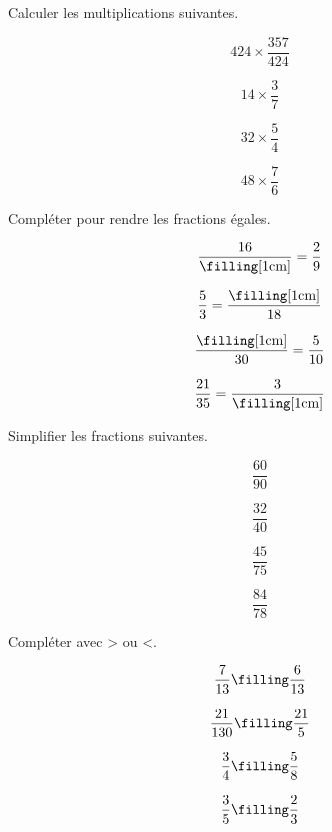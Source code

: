  Calculer les multiplications suivantes.

\begin{multicols}{4}
    $$424\times \dfrac{357}{424}$$\vspace*{1.7cm}
    
    \columnbreak
    $$14\times \dfrac{3}{7}$$\vspace*{1.7cm}
    
    \columnbreak
    $$32\times \dfrac{5}{4}$$\vspace*{1.7cm}
    
    \columnbreak
    $$48\times \dfrac{7}{6}$$\vspace*{1.7cm}
\end{multicols}

 Compléter pour rendre les fractions égales.

\begin{multicols}{4}
    $$ \dfrac{16}{\text{\filling[1cm]}}=\dfrac{2}{9}$$

    $$ \dfrac{5}{3}=\dfrac{\text{\filling[1cm]}}{18}$$

    $$ \dfrac{\text{\filling[1cm]}}{30}=\dfrac{5}{10}$$

    $$ \dfrac{21}{35}=\dfrac{3}{\text{\filling[1cm]}}$$
\end{multicols}

 Simplifier les fractions suivantes.

\begin{multicols}{4}
    $$\dfrac{60}{90}$$\vspace*{1.7cm}
    
    \columnbreak
    $$\dfrac{32}{40}$$\vspace*{1.7cm}
    
    \columnbreak
    $$\dfrac{45}{75}$$\vspace*{1.7cm}
    
    \columnbreak
    $$\dfrac{84}{78}$$\vspace*{1.7cm}
\end{multicols}

 Compléter avec > ou <.

\begin{multicols}{4}
    $$\dfrac{7}{13}\text{\filling}\dfrac{6}{13}$$\vspace*{1.7cm}
    
    \columnbreak
    $$\dfrac{21}{130}\text{\filling}\dfrac{21}{5}$$\vspace*{1.7cm}
    
    \columnbreak
    $$\dfrac{3}{4}\text{\filling}\dfrac{5}{8}$$\vspace*{1.7cm}
    
    \columnbreak
    $$\dfrac{3}{5}\text{\filling}\dfrac{2}{3}$$\vspace*{1.7cm}
\end{multicols}

